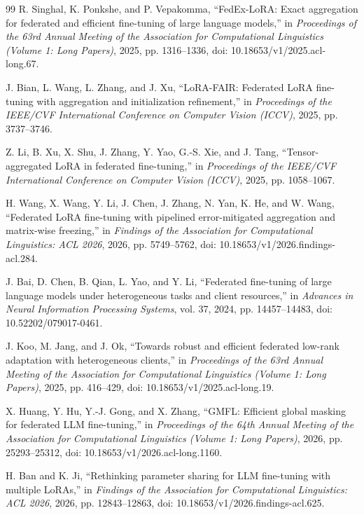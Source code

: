 \documentclass[10pt,conference,letterpaper]{IEEEtran}
\begin{document}
\begin{thebibliography}{99}
R. Singhal, K. Ponkshe, and P. Vepakomma,
``FedEx-LoRA: Exact aggregation for federated and efficient fine-tuning of large language models,''
in \emph{Proceedings of the 63rd Annual Meeting of the Association for Computational Linguistics (Volume 1: Long Papers)}, 2025, pp. 1316--1336,
doi: 10.18653/v1/2025.acl-long.67.

J. Bian, L. Wang, L. Zhang, and J. Xu,
``LoRA-FAIR: Federated LoRA fine-tuning with aggregation and initialization refinement,''
in \emph{Proceedings of the IEEE/CVF International Conference on Computer Vision (ICCV)}, 2025, pp. 3737--3746.

Z. Li, B. Xu, X. Shu, J. Zhang, Y. Yao, G.-S. Xie, and J. Tang,
``Tensor-aggregated LoRA in federated fine-tuning,''
in \emph{Proceedings of the IEEE/CVF International Conference on Computer Vision (ICCV)}, 2025, pp. 1058--1067.

H. Wang, X. Wang, Y. Li, J. Chen, J. Zhang, N. Yan, K. He, and W. Wang,
``Federated LoRA fine-tuning with pipelined error-mitigated aggregation and matrix-wise freezing,''
in \emph{Findings of the Association for Computational Linguistics: ACL 2026}, 2026, pp. 5749--5762,
doi: 10.18653/v1/2026.findings-acl.284.

J. Bai, D. Chen, B. Qian, L. Yao, and Y. Li,
``Federated fine-tuning of large language models under heterogeneous tasks and client resources,''
in \emph{Advances in Neural Information Processing Systems}, vol. 37, 2024, pp. 14457--14483,
doi: 10.52202/079017-0461.

J. Koo, M. Jang, and J. Ok,
``Towards robust and efficient federated low-rank adaptation with heterogeneous clients,''
in \emph{Proceedings of the 63rd Annual Meeting of the Association for Computational Linguistics (Volume 1: Long Papers)}, 2025, pp. 416--429,
doi: 10.18653/v1/2025.acl-long.19.

X. Huang, Y. Hu, Y.-J. Gong, and X. Zhang,
``GMFL: Efficient global masking for federated LLM fine-tuning,''
in \emph{Proceedings of the 64th Annual Meeting of the Association for Computational Linguistics (Volume 1: Long Papers)}, 2026, pp. 25293--25312,
doi: 10.18653/v1/2026.acl-long.1160.

H. Ban and K. Ji,
``Rethinking parameter sharing for LLM fine-tuning with multiple LoRAs,''
in \emph{Findings of the Association for Computational Linguistics: ACL 2026}, 2026, pp. 12843--12863,
doi: 10.18653/v1/2026.findings-acl.625.


\end{thebibliography}
\end{document}
